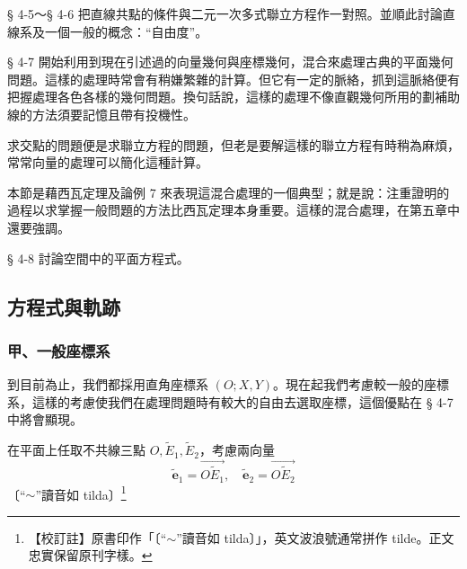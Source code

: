 § 4-5～§ 4-6 把直線共點的條件與二元一次多式聯立方程作一對照。並順此討論直線系及一個一般的概念：“自由度”。

§ 4-7 開始利用到現在引述過的向量幾何與座標幾何，混合來處理古典的平面幾何問題。這樣的處理時常會有稍嫌繁雜的計算。但它有一定的脈絡，抓到這脈絡便有把握處理各色各樣的幾何問題。換句話說，這樣的處理不像直觀幾何所用的劃補助線的方法須要記憶且帶有投機性。

求交點的問題便是求聯立方程的問題，但老是要解這樣的聯立方程有時稍為麻煩，常常向量的處理可以簡化這種計算。

本節是藉西瓦定理及論例 7 來表現這混合處理的一個典型；就是說：注重證明的過程以求掌握一般問題的方法比西瓦定理本身重要。這樣的混合處理，在第五章中還要強調。

§ 4-8 討論空間中的平面方程式。

\subsection{方程式與軌跡}
\label{sec:4-1}

\subsubsection*{甲、一般座標系}

到目前為止，我們都採用直角座標系 $(O; X, Y)$。現在起我們考慮較一般的座標系，這樣的考慮使我們在處理問題時有較大的自由去選取座標，這個優點在 § 4-7 中將會顯現。

在平面上任取不共線三點 $O, \tilde{E}_1, \tilde{E}_2$，考慮兩向量
\[ \tilde{\mathbf{e}}_1 = \vec{O\tilde{E}_1}, \quad \tilde{\mathbf{e}}_2 = \vec{O\tilde{E}_2} \]
〔“$\sim$”讀音如 tilda〕\label{note:b3s-ch4-p132-tilde-pronounce}\footnote{【校訂註】原書印作「〔“$\sim$”讀音如 tilda〕」，英文波浪號通常拼作 tilde。正文忠實保留原刊字樣。}

